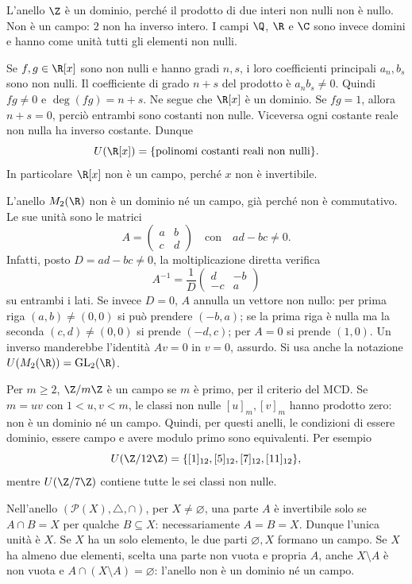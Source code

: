 \begin{esempio}
L'anello $\Z$ è un dominio, perché il prodotto di due interi non nulli non è nullo. Non è un campo: $2$ non ha inverso intero. I campi $\Q$, $\R$ e $\C$ sono invece domini e hanno come unità tutti gli elementi non nulli.
\end{esempio}

\begin{esempio}
Se $f,g\in\R[x]$ sono non nulli e hanno gradi $n,s$, i loro coefficienti principali $a_n,b_s$ sono non nulli. Il coefficiente di grado $n+s$ del prodotto è $a_nb_s\ne0$. Quindi $fg\ne0$ e $\deg(fg)=n+s$. Ne segue che $\R[x]$ è un dominio. Se $fg=1$, allora $n+s=0$, perciò entrambi sono costanti non nulle. Viceversa ogni costante reale non nulla ha inverso costante. Dunque
\[
U(\R[x])=\{\text{polinomi costanti reali non nulli}\}.
\]
In particolare $\R[x]$ non è un campo, perché $x$ non è invertibile.

L'anello $M_2(\R)$ non è un dominio né un campo, già perché non è commutativo. Le sue unità sono le matrici
\[
A=\begin{pmatrix}a&b\\c&d\end{pmatrix}\quad\text{con}\quad ad-bc\ne0.
\]
Infatti, posto $D=ad-bc\ne0$, la moltiplicazione diretta verifica
\[
A^{-1}=\frac1D\begin{pmatrix}d&-b\\-c&a\end{pmatrix}
\]
su entrambi i lati. Se invece $D=0$, $A$ annulla un vettore non nullo: per prima riga $(a,b)\ne(0,0)$ si può prendere $(-b,a)$; se la prima riga è nulla ma la seconda $(c,d)\ne(0,0)$ si prende $(-d,c)$; per $A=0$ si prende $(1,0)$. Un inverso manderebbe l'identità $Av=0$ in $v=0$, assurdo. Si usa anche la notazione $U(M_2(\R))=\operatorname{GL}_2(\R)$.
\end{esempio}

\begin{esempio}
Per $m\ge2$, $\Z/m\Z$ è un campo se $m$ è primo, per il criterio del MCD. Se $m=uv$ con $1<u,v<m$, le classi non nulle $[u]_m,[v]_m$ hanno prodotto zero: non è un dominio né un campo. Quindi, per questi anelli, le condizioni di essere dominio, essere campo e avere modulo primo sono equivalenti. Per esempio
\[
U(\Z/12\Z)=\{[1]_{12},[5]_{12},[7]_{12},[11]_{12}\},
\]
mentre $U(\Z/7\Z)$ contiene tutte le sei classi non nulle.

Nell'anello $(\mathcal P(X),\triangle,\cap)$, per $X\ne\varnothing$, una parte $A$ è invertibile solo se $A\cap B=X$ per qualche $B\subseteq X$: necessariamente $A=B=X$. Dunque l'unica unità è $X$. Se $X$ ha un solo elemento, le due parti $\varnothing,X$ formano un campo. Se $X$ ha almeno due elementi, scelta una parte non vuota e propria $A$, anche $X\setminus A$ è non vuota e $A\cap(X\setminus A)=\varnothing$: l'anello non è un dominio né un campo.
\end{esempio}

